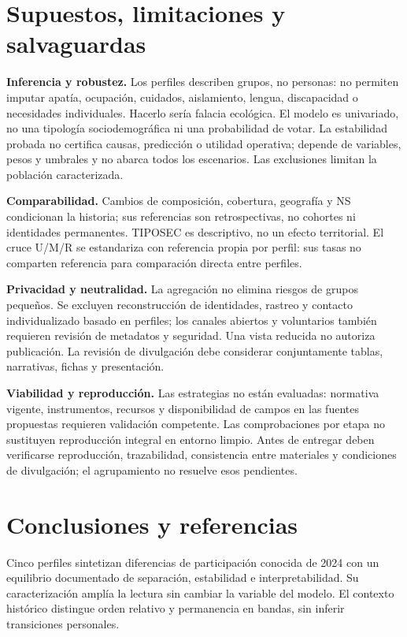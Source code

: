 \documentclass[11pt]{article}
\begin{document}
\section{Supuestos, limitaciones y salvaguardas}

\textbf{Inferencia y robustez.} Los perfiles describen grupos, no personas: no permiten imputar apatía, ocupación, cuidados, aislamiento, lengua, discapacidad o necesidades individuales. Hacerlo sería falacia ecológica. El modelo es univariado, no una tipología sociodemográfica ni una probabilidad de votar. La estabilidad probada no certifica causas, predicción o utilidad operativa; depende de variables, pesos y umbrales y no abarca todos los escenarios. Las exclusiones limitan la población caracterizada.

\textbf{Comparabilidad.} Cambios de composición, cobertura, geografía y NS condicionan la historia; sus referencias son retrospectivas, no cohortes ni identidades permanentes. TIPOSEC es descriptivo, no un efecto territorial. El cruce U/M/R se estandariza con referencia propia por perfil: sus tasas no comparten referencia para comparación directa entre perfiles.

\textbf{Privacidad y neutralidad.} La agregación no elimina riesgos de grupos pequeños. Se excluyen reconstrucción de identidades, rastreo y contacto individualizado basado en perfiles; los canales abiertos y voluntarios también requieren revisión de metadatos y seguridad. Una vista reducida no autoriza publicación. La revisión de divulgación debe considerar conjuntamente tablas, narrativas, fichas y presentación.

\textbf{Viabilidad y reproducción.} Las estrategias no están evaluadas: normativa vigente, instrumentos, recursos y disponibilidad de campos en las fuentes propuestas requieren validación competente. Las comprobaciones por etapa no sustituyen reproducción integral en entorno limpio. Antes de entregar deben verificarse reproducción, trazabilidad, consistencia entre materiales y condiciones de divulgación; el agrupamiento no resuelve esos pendientes.

\section{Conclusiones y referencias}

Cinco perfiles sintetizan diferencias de participación conocida de 2024 con un equilibrio documentado de separación, estabilidad e interpretabilidad. Su caracterización amplía la lectura sin cambiar la variable del modelo. El contexto histórico distingue orden relativo y permanencia en bandas, sin inferir transiciones personales.
\end{document}
